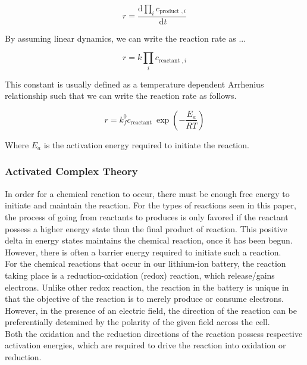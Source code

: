 \documentclass[lettersize,journal]{IEEEtran}
\begin{document}
\begin{equation}
r=\frac{\mathrm{d} \prod_{i} c_{\text {product }, i}}{\mathrm{~d} t}
\end{equation}

\noindent By assuming linear dynamics, we can write the reaction rate as ...

\begin{equation}
r=k \prod_{i} c_{\text {reactant }, i}
\end{equation}

\noindent This constant is usually defined as a temperature dependent Arrhenius relationship such that we can write the reaction rate as follows.

\begin{equation}
 r=k_{f}^{0} c_{\text {reactant }} \exp \left(-\frac{E_{a}}{R T}\right)
\end{equation}

\noindent Where $E_a$ is the activation energy required to initiate the reaction.\\

\subsubsection{Activated Complex Theory}

\noindent In order for a chemical reaction to occur, there must be enough free energy to initiate and maintain the reaction. For the types of reactions seen in this paper, the process of going from reactants to produces is only favored if the reactant possess a higher energy state than the final product of reaction. This positive delta in energy states maintains the chemical reaction, once it has been begun. However, there is often a barrier energy required to initiate such a reaction. \\

For the chemical reactions that occur in our lithium-ion battery, the reaction taking place is a reduction-oxidation (redox) reaction, which release/gains electrons. Unlike other redox reaction, the reaction in the battery is unique in that the objective of the reaction is to merely produce or consume electrons. However, in the presence of an electric field, the direction of the reaction can be preferentially detemined by the polarity of the given field across the cell. \\

Both the oxidation and the reduction directions of the reaction possess respective activation energies, which are required to drive the reaction into oxidation or reduction.
\end{document}
